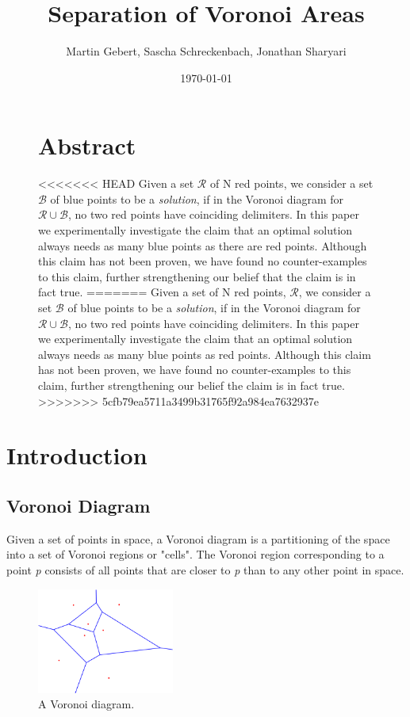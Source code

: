 \documentclass[a4paper,12pt]{article}
\title{\textbf{Separation of Voronoi Areas}}
\author{Martin Gebert, Sascha Schreckenbach, Jonathan Sharyari}  %
\date{\today}
\begin{document}
\maketitle

\begin{figure}
\section*{\large Abstract}
<<<<<<< HEAD
Given a set $\mathcal{R}$ of N red points, we consider a set  $\mathcal{B}$ of blue points to be a \emph{solution}, if in the Voronoi diagram for  $\mathcal{R}\cup\mathcal{B}$, no two red points have coinciding delimiters. In this paper we experimentally investigate the claim that an optimal solution always needs as many blue points as there are red points. Although this claim has not been proven, we have found no counter-examples to this claim, further strengthening our belief that the claim is in fact true.
=======
Given a set of N red points, $\mathcal{R}$, we consider a set  $\mathcal{B}$ of blue points to be a \emph{solution}, if in the Voronoi diagram for  $\mathcal{R}\cup\mathcal{B}$, no two red points have coinciding delimiters. In this paper we experimentally investigate the claim that an optimal solution always needs as many blue points as red points. Although this claim has not been proven, we have found no counter-examples to this claim, further strengthening our belief the claim is in fact true.
>>>>>>> 5cfb79ea5711a3499b31765f92a984ea7632937e
\end{figure}
\newpage

\tableofcontents
\newpage

\section{Introduction}
\subsection{Voronoi Diagram}
Given a set of points in space, a Voronoi diagram is a partitioning of the space into a set of Voronoi regions or "cells". The Voronoi region corresponding to a point \emph{p} consists of all points that are closer to \emph{p} than to any other point in space.

\begin{figure}[hb]
\centering
\includegraphics[width=0.4\textwidth]{pictures/Voronoi-diagram.png}
 \caption[Close up of \textit{Hemidactylus} sp.]
{A Voronoi diagram.}
\end{figure}
\end{document}
